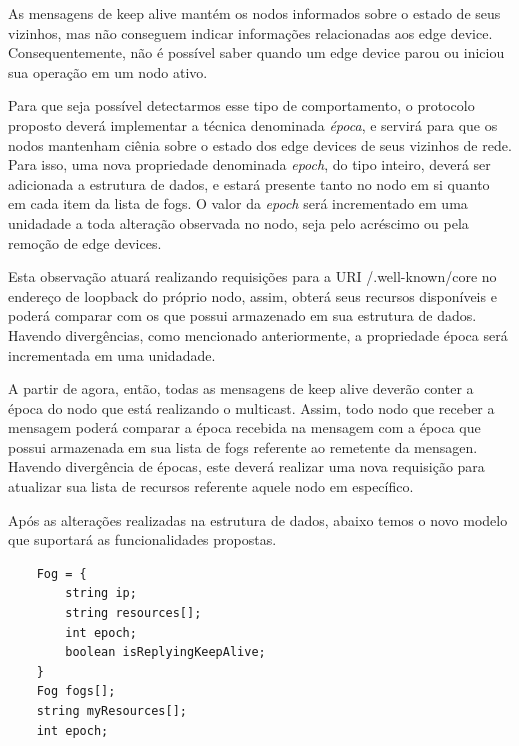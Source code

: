 As mensagens de keep alive mantém os nodos informados sobre o estado de seus vizinhos, mas não conseguem indicar informações relacionadas aos edge device.
Consequentemente, não é possível saber quando um edge device parou ou iniciou sua operação em um nodo ativo.

Para que seja possível detectarmos esse tipo de comportamento, o protocolo proposto deverá implementar a técnica denominada \textit{época},
e servirá para que os nodos mantenham ciênia sobre o estado dos edge devices de seus vizinhos de rede.
Para isso, uma nova propriedade denominada \textit{epoch}, do tipo inteiro, deverá ser adicionada a estrutura de dados, e estará presente tanto no nodo em si quanto em cada item da lista de fogs.
O valor da \textit{epoch} será incrementado em uma unidadade a toda alteração observada no nodo, seja pelo acréscimo ou pela remoção de edge devices.

Esta observação atuará realizando requisições para a URI /.well-known/core no endereço de loopback do próprio nodo,
assim, obterá seus recursos disponíveis e poderá comparar com os que possui armazenado em sua estrutura de dados.
Havendo divergências, como mencionado anteriormente, a propriedade época será incrementada em uma unidadade.

A partir de agora, então, todas as mensagens de keep alive deverão conter a época do nodo que está realizando o multicast.
Assim, todo nodo que receber a mensagem poderá comparar a época recebida na mensagem com a época que possui armazenada em sua lista de fogs referente ao remetente da mensagen.
Havendo divergência de épocas, este deverá realizar uma nova requisição para atualizar sua lista de recursos referente aquele nodo em específico.

Após as alterações realizadas na estrutura de dados, abaixo temos o novo modelo que suportará as funcionalidades propostas.
\begin{verbatim}
    Fog = {
        string ip;
        string resources[];
        int epoch;
        boolean isReplyingKeepAlive;
    }
    Fog fogs[];
    string myResources[];
    int epoch;
\end{verbatim}